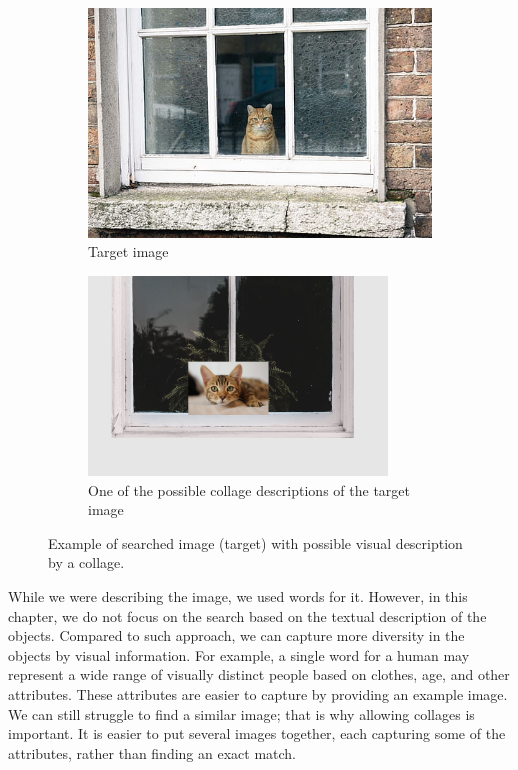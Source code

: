 \begin{figure}
\centering

\begin{subfigure}[t]{0.48\textwidth}
\includegraphics[width=0.95\linewidth]{img/cat_on_window} 
\caption{Target image}
\label{fig:searched_scene}
\end{subfigure}
\begin{subfigure}[t]{0.48\textwidth}
\includegraphics[width=0.95\linewidth]{img/cat_on_window_collage}
\caption{One of the possible collage descriptions of the target image}
\label{fig:collage_example}
\end{subfigure}

\caption{Example of searched image (target) with possible visual description by a collage.}
\label{fig:query_collage_comparison}
\end{figure}

While we were describing the image, we used words for it. However, in this chapter, we do not focus on the search based on the textual description of the objects. Compared to such approach, we can capture more diversity in the objects by visual information. For example, a single word for a human may represent a wide range of visually distinct people based on clothes, age, and other attributes. These attributes are easier to capture by providing an example image. We can still struggle to find a similar image; that is why allowing collages is important. It is easier to put several images together, each capturing some of the attributes, rather than finding an exact match.

